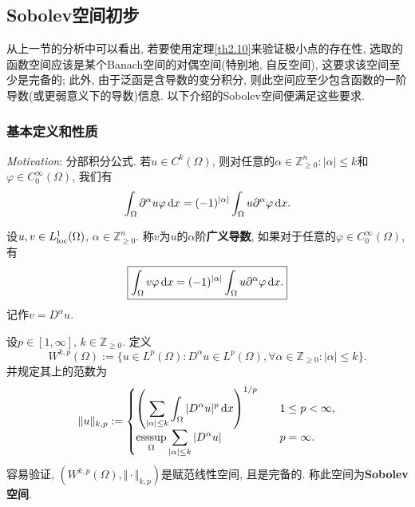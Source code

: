 \subsection{Sobolev空间初步}

从上一节的分析中可以看出, 若要使用定理\ref{th2.10}来验证极小点的存在性, 选取的函数空间应该是某个Banach空间的对偶空间(特别地, 自反空间), 这要求该空间至少是完备的;
此外, 由于泛函是含导数的变分积分, 则此空间应至少包含函数的一阶导数(或更弱意义下的导数)信息. 以下介绍的Sobolev空间便满足这些要求.

\subsubsection{基本定义和性质}

\emph{Motivation}: 分部积分公式. 若$u \in C^k(\Omega)$, 则对任意的$\alpha \in \mathbb{Z}^n_{\geq 0}\colon |\alpha| \leq k$和$\varphi \in C_0^{\infty}(\Omega)$, 我们有
\begin{equation*}
    \int_{\Omega}\partial^{\alpha}u\varphi \,{\rm d}x = (-1)^{|\alpha|}\int_{\Omega}u\partial^{\alpha}\varphi \,{\rm d}x.
\end{equation*}

\begin{definition}
    设$u, v \in L^1_{{\rm loc}}(\Omega)$, $\alpha \in \mathbb{Z}^n_{\geq 0}$.
    称$v$为$u$的$\alpha$阶\textbf{广义导数}, 如果对于任意的$\varphi \in C_0^{\infty}(\Omega)$, 有
    \begin{equation*}
        \boxed{\int_{\Omega}v\varphi \,{\rm d}x = (-1)^{|\alpha|}\int_{\Omega}u\partial^{\alpha}\varphi \,{\rm d}x.}
    \end{equation*}
    记作$v = D^{\alpha}u$.
\end{definition}

\begin{definition}
    设$p \in [1, \infty]$, $k \in \mathbb{Z}_{\geq 0}$. 定义 
    \begin{equation*}
        \boxed{W^{k, p}(\Omega) := \{u \in L^p(\Omega)\colon D^{\alpha}u \in L^p(\Omega), \forall \alpha\in \mathbb{Z}_{\geq 0}\colon |\alpha| \leq k\}.}
    \end{equation*}
    并规定其上的范数为 
    \begin{equation*}
        \Vert u \Vert_{k, p} := 
        \begin{cases}
            \displaystyle\left(\sum_{|\alpha| \leq k}\int_{\Omega}|D^{\alpha}u|^p \,{\rm d}x\right)^{1/p} \quad &1 \leq p < \infty, \\ 
            \displaystyle\mathop{{\rm esssup}}\limits_{\Omega}\sum_{|\alpha| \leq k}|D^{\alpha}u| \quad &p = \infty.
        \end{cases}
    \end{equation*}
    容易验证, $(W^{k, p}(\Omega), \Vert \cdot \Vert_{k, p})$是赋范线性空间, 且是完备的.
    称此空间为\textbf{Sobolev空间}.
\end{definition}

